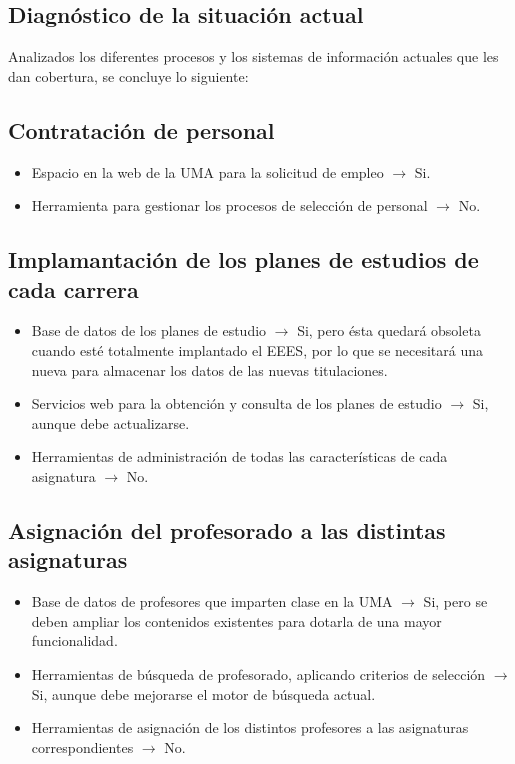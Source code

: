 \documentclass[11pt,a4paper,spanish,twoside]{book}
\begin{document}
\begin{itemize}
\section{Diagnóstico de la situación actual}
Analizados los diferentes procesos y los sistemas de información actuales que les dan cobertura, se concluye lo siguiente:

\subsection{Contratación de personal}
\begin{itemize}
\item Espacio en la web de la UMA para la solicitud de empleo $\to$ Si.
\item Herramienta para gestionar los procesos de selección de personal $\to$ No.
\end{itemize}

\subsection{Implamantación de los planes de estudios de cada carrera}
\begin{itemize}
\item Base de datos de los planes de estudio $\to$ Si, pero ésta quedará obsoleta cuando esté totalmente implantado el EEES, por lo que se necesitará una nueva para almacenar los datos de las nuevas titulaciones.
\item Servicios web para la obtención y consulta de los planes de estudio $\to$ Si, aunque debe actualizarse.
\item Herramientas de administración de todas las características de cada asignatura $\to$ No.
\end{itemize}

\subsection{Asignación del profesorado a las distintas asignaturas}
\begin{itemize}
\item Base de datos de profesores que imparten clase en la UMA $\to$ Si, pero se deben ampliar los contenidos existentes para dotarla de una mayor funcionalidad.
\item Herramientas de búsqueda de profesorado, aplicando criterios de selección $\to$ Si, aunque debe mejorarse el motor de búsqueda actual.
\item Herramientas de asignación de los distintos profesores a las asignaturas correspondientes $\to$ No.
\end{itemize}


\end{itemize}
\end{document}
